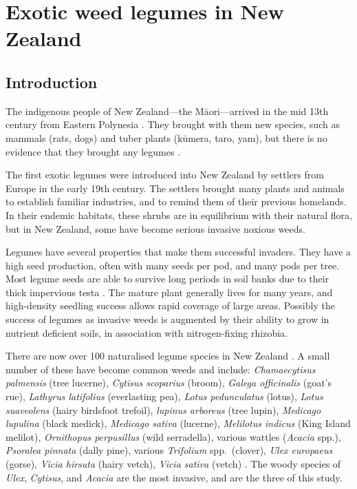 \section{Exotic weed legumes in New Zealand}

\subsection{Introduction}

The indigenous people of New Zealand---the M\=aori---arrived in the
mid 13th century from Eastern Polynesia \citep{Irwin05}. They
brought with them new species, such as mammals (rats, dogs) and
tuber plants (k\=umera, taro, yam), but there is no evidence that
they brought any legumes \citep{Bellich96}.

The first exotic legumes were introduced into New Zealand by
settlers from Europe in the early 19th century. The settlers brought
many plants and animals to establish familiar industries, and to
remind them of their previous homelands. In their endemic habitats,
these shrubs are in equilibrium with their natural flora, but in New
Zealand, some have become serious invasive noxious weeds.

Legumes have several properties that make them successful invaders.
They have a high seed production, often with many seeds per pod, and
many pods per tree. Most legume seeds are able to survive long
periods in soil banks due to their thick impervious testa
\citep{Lee01}. The mature plant generally lives for many years, and
high-density seedling success allows rapid coverage of large areas.
Possibly the success of legumes as invasive weeds is augmented by
their ability to grow in nutrient deficient soils, in association
with nitrogen-fixing rhizobia.


There are now over 100 naturalised legume species in New Zealand
\citep{NZPlant}. A small number of these have become common weeds
and include: \emph{Chamaecytisus palmensis} (tree lucerne),
\emph{Cytisus scoparius} (broom), \emph{Galega officinalis} (goat's
rue), \emph{Lathyrus latifolius} (everlasting pea), \emph{Lotus
pedunculatus} (lotus), \emph{Lotus suaveolens} (hairy birdsfoot
trefoil), \emph{lupinus arboreus} (tree lupin), \emph{Medicago
lupulina} (black medick), \emph{Medicago sativa} (lucerne),
\emph{Melilotus indicus} (King Island melilot), \emph{Ornithopus
perpusillus} (wild serradella), various wattles (\emph{Acacia}
spp.), \emph{Psoralea pinnata} (dally pine), various
\emph{Trifolium} spp.~(clover), \emph{Ulex europaeus} (gorse),
\emph{Vicia hirsuta} (hairy vetch), \emph{Vicia sativa} (vetch)
\citep{Roy04}. The woody species of \emph{Ulex}, \emph{Cytisus}, and
\emph{Acacia} are the most invasive, and are the three of this
study.



